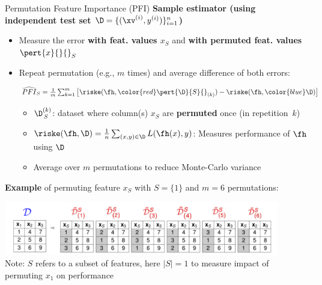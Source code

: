 \documentclass[11pt,compress,t,notes=noshow, aspectratio=169, xcolor=table]{beamer}
\begin{document}
\begin{frame}{Permutation Feature Importance (PFI) }
\textbf{Sample estimator (using independent test set $\D=\{(\xv^{(i)},y^{(i)})\}_{i=1}^{n}$)}

\begin{itemize}
  \item Measure the error {\color{blue}\textbf{with feat. values $x_S$}} and {\color{red}\textbf{with permuted feat. values $\pert{x}{}{}_S$}} 
  \item Repeat permutation (e.g., $m$ times) and average difference of both errors: 

$$
\widehat{PFI}_S = \tfrac{1}{m}  \textstyle\sum\nolimits_{k = 1}^{m} \big[ \riske (\fh, {\color{red}\pert{\D}{S}{}_{(k)}}) - \riske (\fh, {\color{blue}\D}) \big]
$$

\begin{itemize}
  \item $\D^{(k)}_{\,S}$: dataset where column(s) $x_S$ are \textbf{permuted} once (in repetition\ $k$)  
  \item $\riske(\fh, \D) = \frac{1}{n} \sum\nolimits_{(x, y) \in \D}  L(\fh(x), y)$: Measures performance of $\fh$ using $\D$
  \item Average over $m$ permutations to reduce Monte-Carlo variance
\end{itemize}
\end{itemize}

\medskip

\textbf{Example} of permuting feature $x_S$ with $S = \{1\}$ and $m=6$ permutations:

\centering 
\includegraphics[width=0.9\textwidth]{figure_man/permuted-fv.pdf}\\
{\scriptsize
Note: $S$ refers to a subset of features, here $|S|=1$ to measure impact of permuting $x_1$ on performance
}
\end{frame}


\end{document}
